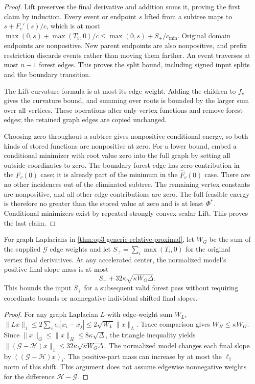 \begin{proof}
Lift preserves the final derivative and addition sums it, proving the first
claim by induction. Every event or endpoint $s$ lifted from a subtree maps
to $s+F_v'(s)/c$, which is at most
$\max(0,s)+\max(T_v,0)/c\leq\max(0,s)+S_+/c_{\min}$.
Original domain endpoints are nonpositive. New parent endpoints are also
nonpositive, and prefix restriction discards events rather than moving them
farther. An event traverses at most $n-1$ forest edges. This proves the
split bound, including signed input splits and the boundary transition.

The Lift curvature formula is at most its edge weight. Adding the children
to $f_v$ gives the curvature bound, and summing over roots is bounded by
the larger sum over all vertices. These operations alter only vertex
functions and remove forest edges; the retained graph edges are copied
unchanged.

Choosing zero throughout a subtree gives nonpositive conditional energy,
so both kinds of stored functions are nonpositive at zero. For a lower
bound, embed a conditional minimizer with root value zero into the full
graph by setting all outside coordinates to zero. The boundary forest edge
has zero contribution in the $F_v(0)$ case; it is already part of the
minimum in the $\widehat F_v(0)$ case. There are no other incidences out
of the eliminated subtree. The remaining vertex constants are nonpositive,
and all other edge contributions are zero. The full feasible energy is
therefore no greater than the stored value at zero and is at least
$\Phi^*$. Conditional minimizers exist by repeated strongly convex scalar
Lift. This proves the last claim.
\end{proof}

\begin{corollary}
\label{cor:op3-generic-proximal-terminal-mass}
For graph Laplacians in \cref{thm:op3-generic-relative-proximal}, let
$W_G$ be the sum of the supplied $\mathcal G$ edge weights and let
$S_+=\sum_i\max(T_i,0)$ for the original vertex final derivatives.
At any accelerated center, the normalized model's positive final-slope
mass is at most
\[
 S_++32\kappa\sqrt{\kappa W_G\Delta}.
\]
This bounds the input $S_+$ for a subsequent valid forest pass without
requiring coordinate bounds or nonnegative individual shifted final slopes.
\end{corollary}
\begin{proof}
For any graph Laplacian $L$ with edge-weight sum $W_L$,
$\|Lx\|_1\leq2\sum_e c_e|x_i-x_j|
\leq2\sqrt{W_L}\|x\|_L$.
Trace comparison gives $W_H\leq\kappa W_G$. Since
$\|x\|_G\leq\|x\|_H\leq8\kappa\sqrt\Delta$, the triangle
inequality yields
$\|(\mathcal G-\mathcal H)x\|_1
\leq32\kappa\sqrt{\kappa W_G\Delta}$.
The normalized model changes each final slope by
$((\mathcal G-\mathcal H)x)_i$. The positive-part mass can increase by
at most the $\ell_1$ norm of this shift. This argument does not assume
edgewise nonnegative weights for the difference $\mathcal H-\mathcal G$.
\end{proof}

